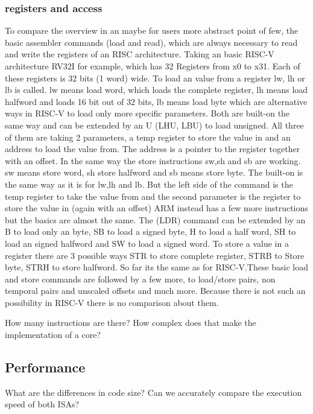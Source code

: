 \documentclass[conference]{IEEEtran}
\begin{document}
\subsubsection{registers and access}
To compare the overview in an maybe for users more abstract point of few, the basic assembler commands (load and read), which are always necessary to read and write the registers of an \gls{RISC} architecture. Taking an basic RISC-V architecture RV32I for example, which has 32 Registers from x0 to x31. Each of these registers is 32 bits (1 word) wide. 
To load an value from a register lw, lh or lb is called. lw means load word, which loads the complete register, lh means load halfword and loads 16 bit out of 32 bits, lb means load byte which are alternative ways in RISC-V to load only more specific parameters. Both are built-on the same way and can be extended by an U (LHU, LBU) to load unsigned. All three of them are taking 2 parameters, a temp register to store the value in and an address to load the value from. The address is a pointer to the register together with an offset.
In the same way the store instructions sw,sh and sb are working. sw means store word, sh store halfword and sb means store byte. The built-on is the same way as it is for lw,lh and lb. But the left side of the command is the temp register to take the value from and the second parameter is the register to store the value in (again with an offset) \cite{Asanovic2016}
ARM instead has a few more instructions but the basics are almost the same. The (LDR) command can be extended by an B to load only an byte, SB to load a signed byte, H to load a half word, SH to load an signed halfword and SW to load a signed word. To store a value in a register there are 3 possible ways STR to store complete register, STRB to Store byte, STRH to store halfword. So far its the same as for RISC-V.These basic load and store commands are followed by a few more, to load/store pairs, non temporal pairs and unscaled offsets and much more. Because there is not such an possibility in RISC-V there is no comparison about them. \cite{ArmManual}



	How many instructions are there? How complex does that make the implementation of a core?
	\subsection{Performance}
	What are the differences in code size? Can we accurately compare the execution speed of both ISAs?
\end{document}
